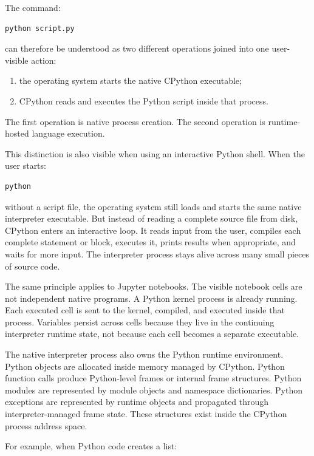The command:

\begin{verbatim}
python script.py
\end{verbatim}

can therefore be understood as two different operations joined into one user-visible action:

\begin{enumerate}
    \item the operating system starts the native CPython executable;
    \item CPython reads and executes the Python script inside that process.
\end{enumerate}

The first operation is native process creation. The second operation is runtime-hosted language execution.

This distinction is also visible when using an interactive Python shell. When the user starts:

\begin{verbatim}
python
\end{verbatim}

without a script file, the operating system still loads and starts the same native interpreter executable. But instead of reading a complete source file from disk, CPython enters an interactive loop. It reads input from the user, compiles each complete statement or block, executes it, prints results when appropriate, and waits for more input. The interpreter process stays alive across many small pieces of source code.

The same principle applies to Jupyter notebooks. The visible notebook cells are not independent native programs. A Python kernel process is already running. Each executed cell is sent to the kernel, compiled, and executed inside that process. Variables persist across cells because they live in the continuing interpreter runtime state, not because each cell becomes a separate executable.

The native interpreter process also owns the Python runtime environment. Python objects are allocated inside memory managed by CPython. Python function calls produce Python-level frames or internal frame structures. Python modules are represented by module objects and namespace dictionaries. Python exceptions are represented by runtime objects and propagated through interpreter-managed frame state. These structures exist inside the CPython process address space.

For example, when Python code creates a list:

